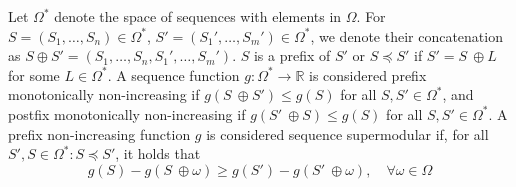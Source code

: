 \documentclass{article} %
\begin{document}
Let $\Omega^*$ denote the space of sequences with elements in $\Omega$. For $S = (S_1, \dots, S_n) \in \Omega^*$,  $S' = (S_1', \dots, S_m') \in \Omega^*$, we denote their concatenation as $S \oplus S' = (S_1, \dots, S_n, S_1', \dots, S_m')$. $S$ is a prefix of $S'$ or $S \preceq S'$ if $S' = S \ \oplus L$ for some $L \in \Omega^*$.
A sequence function $g: \Omega^* \to \mathbb{R}$ is considered prefix monotonically non-increasing if $g(S \ \oplus S') \leq g(S)$ for all $S, S' \in \Omega^*$, and postfix monotonically non-increasing if $g(S' \ \oplus S) \leq g(S)$ for all $S, S' \in \Omega^*$. A prefix non-increasing function $g$ is considered sequence supermodular if, for all $S', S \in \Omega^*: S \preceq S'$, it holds that
\begin{equation}\label{eqn:supermod}
    g(S) - g(S \ \oplus \omega ) \geq g(S') - g(S' \ \oplus \omega ), \quad \forall \omega \in \Omega
\end{equation}
\end{document}
